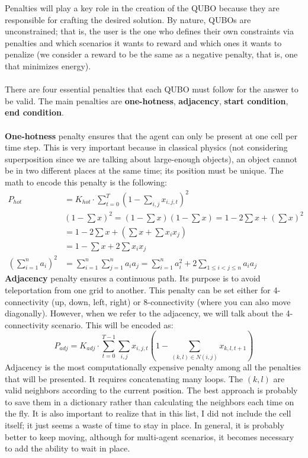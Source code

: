 \documentclass[11pt]{article}
\begin{document}
Penalties will play a key role in the creation of the QUBO because they are responsible for crafting the desired solution. By nature, QUBOs are unconstrained; that is, the user is the one who defines their own constraints via penalties and which scenarios it wants to reward and which ones it wants to penalize (we consider a reward to be the same as a negative penalty, that is, one that minimizes energy).\\
\\
There are four essential penalties that each QUBO must follow for the answer to be valid. The main penalties are \textbf{one-hotness}, \textbf{adjacency}, \textbf{start condition}, \textbf{end condition}.\\
\\
\textbf{One-hotness} penalty ensures that the agent can only be present at one cell per time step. This is very important because in classical physics (not considering superposition since we are talking about large-enough objects), an object cannot be in two different places at the same time; its position must be unique. The math to encode this penalty is the following:
\[
\begin{aligned}
   P_{hot}&= K_{hot} \cdot \sum^T_{t=0}(1-\sum_{i,j}x_{i,j,t})^2 \\[1em]
   &(1-\sum x)^2 = (1-\sum x)(1-\sum x) = 1 - 2\sum x +
   (\sum x)^2 \\
&=1-2\sum x + (\sum x + \sum x_ix_j) \\ 
&= 1 - \sum x + 2 \sum x_ix_j \\
\left( \sum_{i=1}^{n} a_i \right)^2 &= \sum_{i=1}^{n} \sum_{j=1}^{n} a_i a_j = \sum_{i=1}^{n} a_i^2 + 2 \sum_{1 \leq i < j \leq n} a_i a_j
\end{aligned}
\]
\textbf{Adjacency} penalty ensures a continuous path. Its purpose is to avoid teleportation from one grid to another. This penalty can be set either for 4-connectivity (up, down, left, right) or 8-connectivity (where you can also move diagonally). However, when we refer to the adjacency, we will talk about the 4-connectivity scenario. This will be encoded as:
\[
P_{adj}=K_{adj} \cdot \sum_{t=0}^{T-1}\sum_{i,j}x_{i,j,t}(1-\sum_{(k,l)\in N(i,j)}x_{k,l,t+1})
\]
Adjacency is the most computationally expensive penalty among all the penalties that will be presented. It requires concatenating many loops. The \((k,l)\) are valid neighbors according to the current position. The best approach is probably to save them in a dictionary rather than calculating the neighbors each time on the fly. It is also important to realize that in this list, I did not include the cell itself; it just seems a waste of time to stay in place. In general, it is probably better to keep moving, although for multi-agent scenarios, it becomes necessary to add the ability to wait in place.\\
\end{document}
